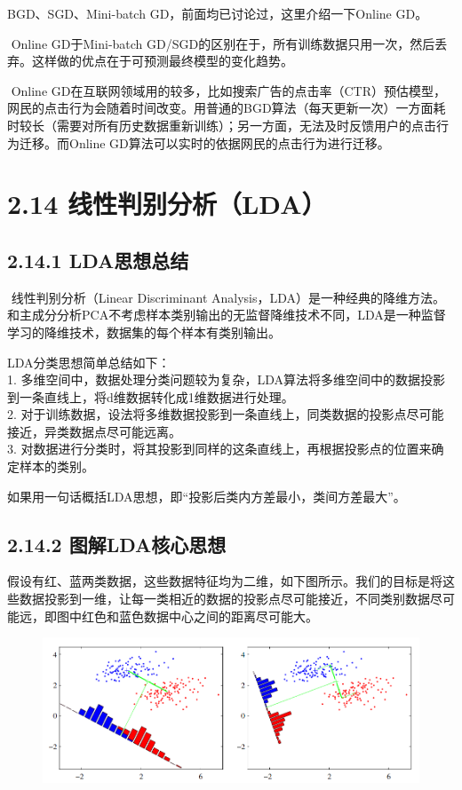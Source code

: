 BGD、SGD、Mini-batch GD，前面均已讨论过，这里介绍一下Online GD。

​ Online GD于Mini-batch
GD/SGD的区别在于，所有训练数据只用一次，然后丢弃。这样做的优点在于可预测最终模型的变化趋势。

​ Online
GD在互联网领域用的较多，比如搜索广告的点击率（CTR）预估模型，网民的点击行为会随着时间改变。用普通的BGD算法（每天更新一次）一方面耗时较长（需要对所有历史数据重新训练）；另一方面，无法及时反馈用户的点击行为迁移。而Online
GD算法可以实时的依据网民的点击行为进行迁移。

\section{2.14
线性判别分析（LDA）}\label{ux7ebfux6027ux5224ux522bux5206ux6790lda}

\subsection{2.14.1 LDA思想总结}\label{ldaux601dux60f3ux603bux7ed3}

​ 线性判别分析（Linear Discriminant
Analysis，LDA）是一种经典的降维方法。和主成分分析PCA不考虑样本类别输出的无监督降维技术不同，LDA是一种监督学习的降维技术，数据集的每个样本有类别输出。

LDA分类思想简单总结如下：\\
1.
多维空间中，数据处理分类问题较为复杂，LDA算法将多维空间中的数据投影到一条直线上，将d维数据转化成1维数据进行处理。\\
2.
对于训练数据，设法将多维数据投影到一条直线上，同类数据的投影点尽可能接近，异类数据点尽可能远离。\\
3.
对数据进行分类时，将其投影到同样的这条直线上，再根据投影点的位置来确定样本的类别。

如果用一句话概括LDA思想，即``投影后类内方差最小，类间方差最大''。

\subsection{2.14.2
图解LDA核心思想}\label{ux56feux89e3ldaux6838ux5fc3ux601dux60f3}

​
假设有红、蓝两类数据，这些数据特征均为二维，如下图所示。我们的目标是将这些数据投影到一维，让每一类相近的数据的投影点尽可能接近，不同类别数据尽可能远，即图中红色和蓝色数据中心之间的距离尽可能大。

\begin{figure}
\centering
\includegraphics{./img/ch2/2.29/1.png}
\caption{}
\end{figure}

